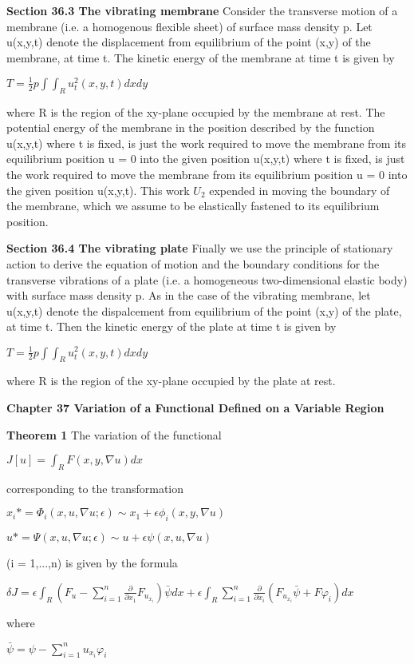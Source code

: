 \documentclass{article}
\begin{document}
\textbf {Section 36.3 The vibrating membrane} Consider the transverse motion of a membrane (i.e. a homogenous flexible sheet) of surface mass density p. Let u(x,y,t) denote the displacement from equilibrium of the point (x,y) of the membrane, at time t. The kinetic energy of the membrane at time t is given by
\begin{center}
$T = \frac{1}{2} p \int \int_R u_t^2 (x,y,t) dx dy$
\end{center}
where R is the region of the xy-plane occupied by the membrane at rest. The potential energy of the membrane in the position described by the function u(x,y,t) where t is fixed, is just the work required to move the membrane from its equilibrium position u = 0 into the given position u(x,y,t) where t is fixed, is just the work required to move the membrane from its equilibrium position u = 0 into the given position u(x,y,t). This work $U_2$ expended in moving the boundary of the membrane, which we assume to be elastically fastened to its equilibrium position.

\textbf {Section 36.4 The vibrating plate} Finally we use the principle of stationary action to derive the equation of motion and the boundary conditions for the transverse vibrations of a plate (i.e. a homogeneous two-dimensional elastic body) with surface mass density p. As in the case of the vibrating membrane, let u(x,y,t) denote the dispalcement from equilibrium of the point (x,y) of the plate, at time t. Then the kinetic energy of the plate at time t is given by
\begin{center}
$T = \frac{1}{2} p \int \int_R u_t^2 (x,y,t) dx dy$
\end{center}
where R is the region of the xy-plane occupied by the plate at rest.

\textbf {Chapter 37 Variation of a Functional Defined on a Variable Region}

\textbf {Theorem 1} The variation of the functional
\begin{center}
$J[u] = \int_R F(x, y, \nabla u) dx$
\end{center}
corresponding to the transformation
\begin{center}
$x_i* = \Phi_i(x, u, \nabla u; \epsilon) \sim x_1 + \epsilon \phi_i(x,y, \nabla u)$
\end{center}
\begin{center}
$u* = \Psi(x, u, \nabla u; \epsilon) \sim u + \epsilon \psi(x,u, \nabla u)$
\end{center}
(i = 1,...,n) is given by the formula
\begin{center}
$\delta J = \epsilon \int_R (F_u - \sum_{i=1}^n \frac{\partial}{\partial x_1} F_{u_{x_{i}}}) \bar{\psi} dx + \epsilon \int_R \sum_{i=1}^n \frac{\partial}{\partial x_i} (F_{u_{x_{i}}} \bar{\psi} + F \varphi_i) dx $
\end{center}
where
\begin{center}
$\bar{\psi} = \psi - \sum_{i=1}^n u_{x_i} \varphi_i$
\end{center}
\end{document}
